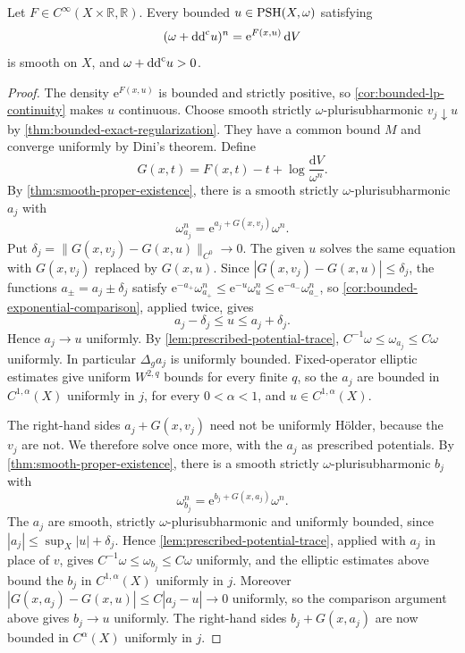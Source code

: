 \begin{theorem}\label{thm:bounded-hermitian-smoothness}
Let $F\in C^\infty(X\times\mathbb R,\mathbb R)$. Every bounded $u\in\mathrm{PSH}(X,\omega)$ satisfying
\[
 (\omega+\mathrm{dd}^{\mathrm{c}} u)^n=\mathrm e^{F(x,u)}\,\mathrm dV
\]
is smooth on $X$, and $\omega+\mathrm{dd}^{\mathrm{c}} u>0$.
\end{theorem}
\begin{proof}
The density $\mathrm e^{F(x,u)}$ is bounded and strictly positive, so \cref{cor:bounded-lp-continuity} makes $u$ continuous.
Choose smooth strictly $\omega$-plurisubharmonic $v_j\downarrow u$ by \cref{thm:bounded-exact-regularization}. They have a common bound $M$ and converge uniformly by Dini's theorem.
Define
\[
 G(x,t)=F(x,t)-t+\log\frac{\mathrm dV}{\omega^n}.
\]
By \cref{thm:smooth-proper-existence}, there is a smooth strictly $\omega$-plurisubharmonic $a_j$ with
\[
 \omega_{a_j}^n=\mathrm e^{a_j+G(x,v_j)}\omega^n.
\]
Put $\delta_j=\|G(x,v_j)-G(x,u)\|_{C^0}\to0$.
The given $u$ solves the same equation with $G(x,v_j)$ replaced by $G(x,u)$.
Since $|G(x,v_j)-G(x,u)|\leq\delta_j$, the functions $a_\pm=a_j\pm\delta_j$ satisfy $\mathrm e^{-a_+}\omega_{a_+}^n\leq\mathrm e^{-u}\omega_u^n\leq\mathrm e^{-a_-}\omega_{a_-}^n$, so \cref{cor:bounded-exponential-comparison}, applied twice, gives
\[
 a_j-\delta_j\leq u\leq a_j+\delta_j.
\]
Hence $a_j\to u$ uniformly. By \cref{lem:prescribed-potential-trace},
$C^{-1}\omega\leq\omega_{a_j}\leq C\omega$ uniformly.
In particular $\Delta_ga_j$ is uniformly bounded. Fixed-operator elliptic estimates give uniform $W^{2,q}$ bounds for every finite $q$, so the $a_j$ are bounded in $C^{1,\alpha}(X)$ uniformly in $j$, for every $0<\alpha<1$, and $u\in C^{1,\alpha}(X)$.

The right-hand sides $a_j+G(x,v_j)$ need not be uniformly H\"older, because the $v_j$ are not. We therefore solve once more, with the $a_j$ as prescribed potentials. By \cref{thm:smooth-proper-existence}, there is a smooth strictly $\omega$-plurisubharmonic $b_j$ with
\[
 \omega_{b_j}^n=\mathrm e^{b_j+G(x,a_j)}\omega^n.
\]
The $a_j$ are smooth, strictly $\omega$-plurisubharmonic and uniformly bounded, since $|a_j|\leq\sup_X|u|+\delta_j$. Hence \cref{lem:prescribed-potential-trace}, applied with $a_j$ in place of $v$, gives $C^{-1}\omega\leq\omega_{b_j}\leq C\omega$ uniformly, and the elliptic estimates above bound the $b_j$ in $C^{1,\alpha}(X)$ uniformly in $j$. Moreover $|G(x,a_j)-G(x,u)|\leq C|a_j-u|\to0$ uniformly, so the comparison argument above gives $b_j\to u$ uniformly. The right-hand sides $b_j+G(x,a_j)$ are now bounded in $C^\alpha(X)$ uniformly in $j$.


\end{proof}
